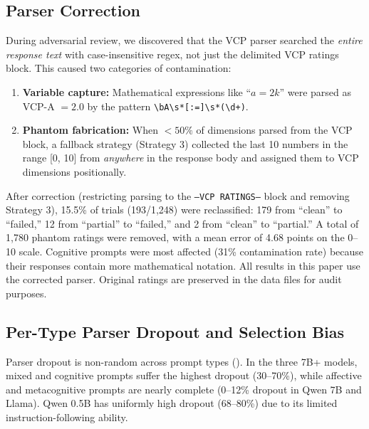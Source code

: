 \documentclass[11pt,a4paper]{article}
\begin{document}
\subsection{Parser Correction}
\label{sec:parser_correction}

During adversarial review, we discovered that the VCP parser searched the \emph{entire response text} with case-insensitive regex, not just the delimited VCP ratings block. This caused two categories of contamination:

\begin{enumerate}
    \item \textbf{Variable capture:} Mathematical expressions like ``$a = 2k$'' were parsed as VCP-A $= 2.0$ by the pattern \verb|\bA\s*[:=]\s*(\d+)|.
    \item \textbf{Phantom fabrication:} When $< 50\%$ of dimensions parsed from the VCP block, a fallback strategy (Strategy 3) collected the last 10 numbers in the range [0, 10] from \emph{anywhere} in the response body and assigned them to VCP dimensions positionally.
\end{enumerate}

After correction (restricting parsing to the \texttt{---VCP RATINGS---} block and removing Strategy 3), 15.5\% of trials (193/1,248) were reclassified: 179 from ``clean'' to ``failed,'' 12 from ``partial'' to ``failed,'' and 2 from ``clean'' to ``partial.'' A total of 1,780 phantom ratings were removed, with a mean error of 4.68 points on the 0--10 scale. Cognitive prompts were most affected (31\% contamination rate) because their responses contain more mathematical notation. All results in this paper use the corrected parser. Original ratings are preserved in the data files for audit purposes.

\subsection{Per-Type Parser Dropout and Selection Bias}
\label{sec:dropout}

Parser dropout is non-random across prompt types (). In the three 7B+ models, mixed and cognitive prompts suffer the highest dropout (30--70\%), while affective and metacognitive prompts are nearly complete (0--12\% dropout in Qwen 7B and Llama). Qwen 0.5B has uniformly high dropout (68--80\%) due to its limited instruction-following ability.
\end{document}
